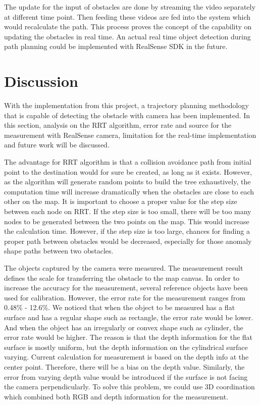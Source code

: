 \documentclass[
  oneside]{ubcthesis}
\begin{document}
The update for the input of obstacles are done by streaming the video separately at different time point. Then feeding these videos are fed into the system which would recalculate the path. This process proves the concept of the capability on updating the obstacles in real time. An actual real time object detection during path planning could be implemented with RealSense SDK in the future.

\hypertarget{discussion}{%
\chapter{Discussion}\label{discussion}}

With the implementation from this project, a trajectory planning methodology that is capable of detecting the obstacle with camera has been implemented. In this section, analysis on the RRT algorithm, error rate and source for the measurement with RealSense camera, limitation for the real-time implementation and future work will be discussed.

The advantage for RRT algorithm is that a collision avoidance path from initial point to the destination would for sure be created, as long as it exists. However, as the algorithm will generate random points to build the tree exhaustively, the computation time will increase dramatically when the obstacles are close to each other on the map. It is important to choose a proper value for the step size between each node on RRT. If the step size is too small, there will be too many nodes to be generated between the two points on the map. This would increase the calculation time. However, if the step size is too large, chances for finding a proper path between obstacles would be decreased, especially for those anomaly shape paths between two obstacles.

The objects captured by the camera were measured. The measurement result defines the scale for transferring the obstacle to the map canvas. In order to increase the accuracy for the measurement, several reference objects have been used for calibration. However, the error rate for the measurement ranges from 0.48\% - 12.6\%. We noticed that when the object to be measured has a flat surface and has a regular shape such as rectangle, the error rate would be lower. And when the object has an irregularly or convex shape such as cylinder, the error rate would be higher. The reason is that the depth information for the flat surface is mostly uniform, but the depth information on the cylindrical surface varying. Current calculation for measurement is based on the depth info at the center point. Therefore, there will be a bias on the depth value. Similarly, the error from varying depth value would be introduced if the surface is not facing the camera perpendicularly. To solve this problem, we could use 3D coordination which combined both RGB and depth information for the measurement.
\end{document}

